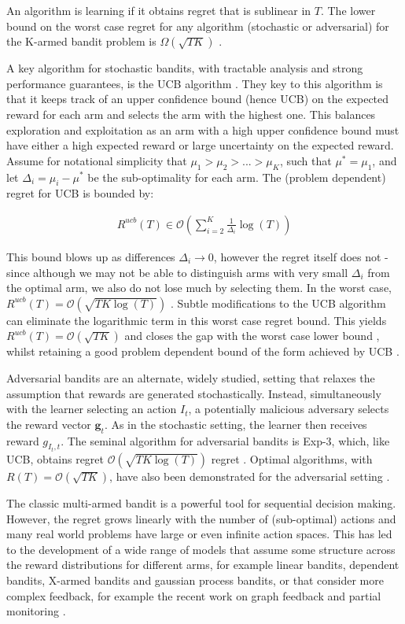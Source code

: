 \documentclass[11pt,a4paper]{article}
\newcommand{\eqn}[1]{\begin{align}#1\end{align}}
\newcommand{\bigo}[1]{\mathcal{O}\left( #1 \right)}
\newcommand{\bigomega}[1]{\Omega\left( #1 \right)}
\begin{document}
An algorithm is learning if it obtains regret that is sublinear in $T$. The lower bound on the worst case regret for any algorithm (stochastic or adversarial) for the K-armed bandit problem is  $\bigomega{\sqrt{TK}}$ \cite{Auer1995}.

A key algorithm for stochastic bandits, with tractable analysis and strong performance guarantees, is the UCB algorithm \cite{Auer2002}. They key to this algorithm is that it keeps track of an upper confidence bound (hence UCB) on the expected reward for each arm and selects the arm with the highest one. This balances exploration and exploitation as an arm with a high upper confidence bound must have either a high expected reward or large uncertainty on the expected reward. Assume for notational simplicity that $\mu_1 > \mu_2 > ... > \mu_K$, such that $\mu^* = \mu_1$, and let $\Delta_i = \mu_i - \mu^*$ be the sub-optimality for each arm. The (problem dependent) regret for UCB is bounded by: 

\eqn {
R^{ucb}(T) \in \bigo{\sum_{i=2}^K \frac{1}{\Delta_i}\log(T)}
}

This bound blows up as differences $\Delta_i \rightarrow 0$, however the regret itself does not - since although we may not be able to distinguish arms with very small $\Delta_i$ from the optimal arm, we also do not lose much by selecting them. In the worst case, $R^{ucb}(T) = \bigo{\sqrt{TK\log(T)}}$ \cite{Bubeck2012}. Subtle modifications to the UCB algorithm can eliminate the logarithmic term in this worst case regret bound. This yields $R^{ucb}(T) = \bigo{\sqrt{TK}}$ and closes the gap with the worst case lower bound \cite{Audibert2009,Lattimore2015}, whilst retaining a good problem dependent bound of the form achieved by UCB \cite{Lattimore2015}.

Adversarial bandits are an alternate, widely studied, setting that relaxes the assumption that rewards are generated stochastically. Instead, simultaneously with the learner selecting an action $I_t$, a potentially malicious adversary selects the reward vector $\boldsymbol{g}_t$. As in the stochastic setting, the learner then receives reward $g_{I_t,t}$. The seminal algorithm for adversarial bandits is Exp-3, which, like UCB, obtains regret $\bigo{\sqrt{TK\log(T)}}$ regret \cite{Auer1995}. Optimal algorithms, with $R(T) = \bigo{\sqrt{TK}}$, have also been demonstrated for the adversarial setting \cite{Audibert2009}.

The classic multi-armed bandit is a powerful tool for sequential decision making. However, the regret grows linearly with the number of (sub-optimal) actions and many real world problems have large or even infinite action spaces. This has led to the development of a wide range of models that assume some structure across the reward distributions for different arms, for example linear bandits, dependent bandits, X-armed bandits and gaussian process bandits, or that consider more complex feedback, for example the recent work on graph feedback \cite{Mannor2011,Lelarge2012,Alon2013,Buccapatnam2014,Kocak2014,Alon2015} and partial monitoring \cite{Piccolboni2001,Bartok2014}. 
\end{document}
